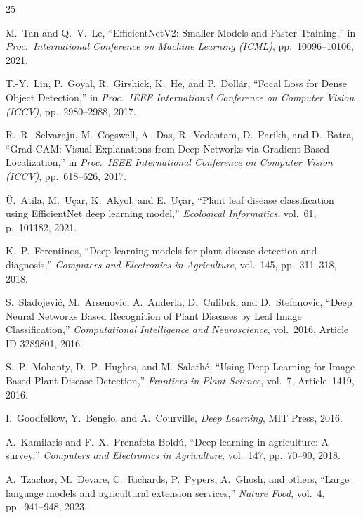 \documentclass[12pt,a4paper]{report}
\begin{document}

\begin{thebibliography}{25}

M.~Tan and Q.~V.~Le,
``EfficientNetV2: Smaller Models and Faster Training,''
in \textit{Proc.\ International Conference on Machine Learning (ICML)}, pp.~10096--10106, 2021.

T.-Y.~Lin, P.~Goyal, R.~Girshick, K.~He, and P.~Doll\'{a}r,
``Focal Loss for Dense Object Detection,''
in \textit{Proc.\ IEEE International Conference on Computer Vision (ICCV)}, pp.~2980--2988, 2017.

R.~R.~Selvaraju, M.~Cogswell, A.~Das, R.~Vedantam, D.~Parikh, and D.~Batra,
``Grad-CAM: Visual Explanations from Deep Networks via Gradient-Based Localization,''
in \textit{Proc.\ IEEE International Conference on Computer Vision (ICCV)}, pp.~618--626, 2017.

\"{U}.~Atila, M.~U\c{c}ar, K.~Akyol, and E.~U\c{c}ar,
``Plant leaf disease classification using EfficientNet deep learning model,''
\textit{Ecological Informatics}, vol.~61, p.~101182, 2021.

K.~P.~Ferentinos,
``Deep learning models for plant disease detection and diagnosis,''
\textit{Computers and Electronics in Agriculture}, vol.~145, pp.~311--318, 2018.

S.~Sladojevi\'{c}, M.~Arsenovic, A.~Anderla, D.~Culibrk, and D.~Stefanovic,
``Deep Neural Networks Based Recognition of Plant Diseases by Leaf Image Classification,''
\textit{Computational Intelligence and Neuroscience}, vol.~2016, Article ID 3289801, 2016.

S.~P.~Mohanty, D.~P.~Hughes, and M.~Salath\'{e},
``Using Deep Learning for Image-Based Plant Disease Detection,''
\textit{Frontiers in Plant Science}, vol.~7, Article~1419, 2016.

I.~Goodfellow, Y.~Bengio, and A.~Courville,
\textit{Deep Learning},
MIT Press, 2016.

A.~Kamilaris and F.~X.~Prenafeta-Bold\'{u},
``Deep learning in agriculture: A survey,''
\textit{Computers and Electronics in Agriculture}, vol.~147, pp.~70--90, 2018.

A.~Tzachor, M.~Devare, C.~Richards, P.~Pypers, A.~Ghosh, and others,
``Large language models and agricultural extension services,''
\textit{Nature Food}, vol.~4, pp.~941--948, 2023.


\end{thebibliography}
\end{document}
